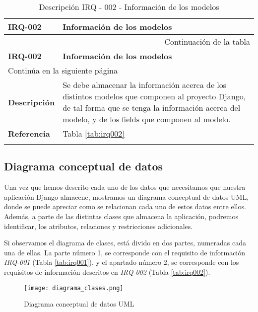 \begin{center}
\begin{longtable}{||p{3.4cm}|p{12cm}||}
 \hline \hline \bf IRQ-002 &  \bf Información de los modelos \\
\hline
\endfirsthead
\hline \multicolumn{2}{|r|}{{Continuación de la tabla}} \\ \hline
 \hline \bf IRQ-002 &  \bf Información de los modelos \\
\hline
\endhead
\hline \multicolumn{2}{|l|}{{Continúa en la siguiente página}} \\ \hline
\endfoot
\endlastfoot
 \hline \bf Descripción & Se debe almacenar la información acerca de los
             distintos modelos que componen al proyecto Django, de tal forma que
             se tenga la información acerca del modelo, y de los fields que
             componen al modelo.\\
 \hline \bf Referencia & Tabla \ref{tab:irq002}\\
\hline
\hline
\caption{\label{tab:irq002-red} Descripción IRQ - 002 - Información de los modelos} 
\end{longtable}
\end{center}


\subsection{Diagrama conceptual de datos}

Una vez que hemos descrito cada uno de los datos que necesitamos que nuestra
aplicación Django almacene, mostramos un diagrama conceptual de datos UML,
donde se puede apreciar como se relacionan cada uno de estos datos entre ellos.
Además, a parte de las distintas clases que almacena la aplicación, podremos
identificar, los atributos, relaciones y restricciones adicionales.

Si observamos el diagrama de clases, está divido en dos partes, numeradas cada
una de ellas. La parte número 1, se corresponde con el requisito de información
\textit{IRQ-001} (Tabla \ref{tab:irq001}), y el apartado número 2, se
corresponde con los requisitos de información descritos en \textit{IRQ-002}
(Tabla \ref{tab:irq002}).

\newpage

\begin{figure}[H]
    \begin{center}
        \texttt{[image: diagrama\_clases.png]}
    \end{center}
    \caption{Diagrama conceptual de datos UML}
    \label{fig:ClasesUML}
\end{figure}

